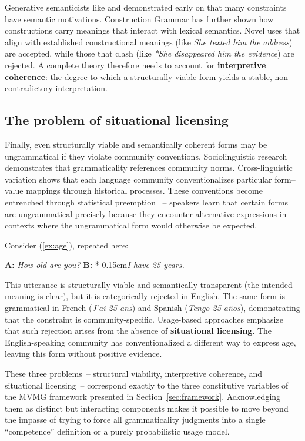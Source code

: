 \documentclass[12pt,letterpaper]{article}
\newcommand{\mention}[1]{\textit{#1}}
\newcommand{\olang}[1]{\textit{#1}}
\newcommand{\judgesep}{\kern-0.15em}
\newcommand{\ungram}[1]{*\judgesep#1}
\begin{document}
Generative semanticists like \textcite{lakoff1971} and \textcite{mccawley1968} demonstrated early on that many constraints have semantic motivations. Construction Grammar \autocite{goldberg1995constructions} has further shown how constructions carry meanings that interact with lexical semantics. Novel uses that align with established constructional meanings (like \mention{She texted him the address}) are accepted, while those that clash (like \textit{*She disappeared him the evidence}) are rejected. A complete theory therefore needs to account for \textbf{interpretive coherence}: the degree to which a structurally viable form yields a stable, non-contradictory interpretation.

\subsection{The problem of situational licensing}\label{sec:impasse-licensing}

Finally, even structurally viable and semantically coherent forms may be ungrammatical if they violate community conventions. Sociolinguistic research \autocite{labov1972} demonstrates that grammaticality references community norms. Cross-linguistic variation shows that each language community conventionalizes particular form--value mappings through historical processes. These conventions become entrenched through statistical preemption \autocite{Goldberg2011}~-- speakers learn that certain forms are ungrammatical precisely because they encounter alternative expressions in contexts where the ungrammatical form would otherwise be expected.

Consider (\ref{ex:age}), repeated here:

\ea
\textbf{A:} \mention{How old are you?} \textbf{B:} \ungram{\mention{I have 25 years.}}
\z

This utterance is structurally viable and semantically transparent (the intended meaning is clear), but it is categorically rejected in English. The same form is grammatical in French (\olang{J'ai 25 ans}) and Spanish (\olang{Tengo 25 años}), demonstrating that the constraint is community-specific. Usage-based approaches \autocite{bybee2006} emphasize that such rejection arises from the absence of \textbf{situational licensing}. The English-speaking community has conventionalized a different way to express age, leaving this form without positive evidence.

\bigskip
These three problems~-- structural viability, interpretive coherence, and situational licensing~-- correspond exactly to the three constitutive variables of the MVMG framework presented in Section~\ref{sec:framework}. Acknowledging them as distinct but interacting components makes it possible to move beyond the impasse of trying to force all grammaticality judgments into a single \enquote{competence} definition or a purely probabilistic usage model.
\end{document}
